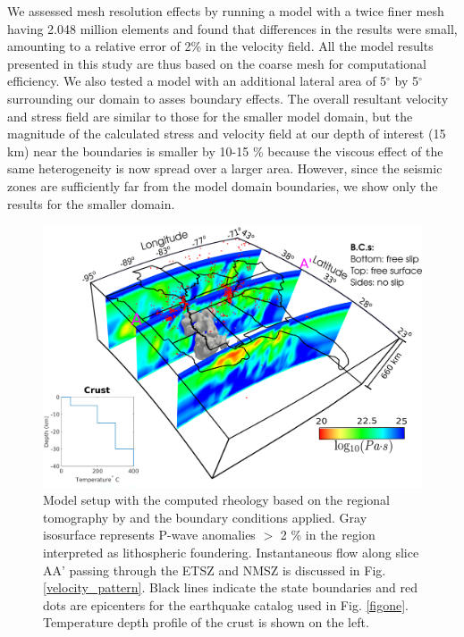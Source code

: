 \documentclass[draft,linenumbers]{agujournal2018}
\begin{document}
We assessed mesh resolution effects by running a model with a twice finer mesh having 2.048 million elements and found that differences in the results were small, amounting to a relative error of 2\% in the velocity field. All the model results presented in this study are thus based on the coarse mesh for computational efficiency. We also tested a model with an additional lateral area of 5$^{\circ}$ by 5$^{\circ}$ surrounding our domain to asses boundary effects. The overall resultant velocity and stress field are similar to those for the smaller model domain, but the magnitude of the calculated stress and velocity field at our depth of interest (15 km) near the boundaries is smaller by 10-15 \% because the viscous effect of the same heterogeneity is now spread over a larger area. However, since the seismic zones are sufficiently far from the model domain boundaries, we show only the results for the smaller domain.
%
\begin{figure}[ht]
    \centering
    \includegraphics[width=0.75\linewidth]{figures/model_figure.png}
    \caption{Model setup with the computed rheology based on the regional tomography by \citet{Biryol_2016} and the boundary conditions applied. Gray isosurface represents P-wave anomalies $>$ 2 \% in the region interpreted as lithospheric foundering. Instantaneous flow along slice AA' passing through the ETSZ and NMSZ is discussed in Fig. \ref{velocity_pattern}. Black lines indicate the state boundaries and red dots are epicenters for the earthquake catalog used in Fig. \ref{figone}. Temperature depth profile of the crust is shown on the left.}
    \label{fig_model}
\end{figure}
\end{document}

